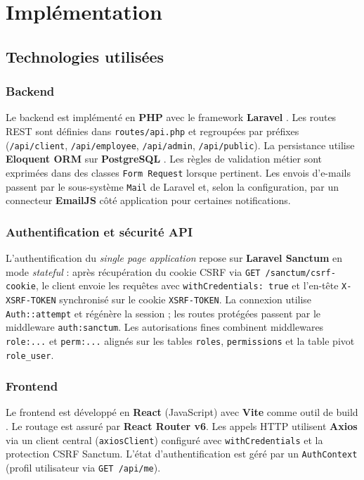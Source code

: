 \chapter{Implémentation}
\label{chap:impl}

\section{Technologies utilisées}

\subsection{Backend}

Le backend est implémenté en \textbf{PHP} avec le framework \textbf{Laravel} \cite{laraveldoc}. Les routes REST sont définies dans \texttt{routes/api.php} et regroupées par préfixes (\texttt{/api/client}, \texttt{/api/employee}, \texttt{/api/admin}, \texttt{/api/public}). La persistance utilise \textbf{Eloquent ORM} sur \textbf{PostgreSQL} \cite{postgresdoc}. Les règles de validation métier sont exprimées dans des classes \texttt{Form Request} lorsque pertinent. Les envois d'e-mails passent par le sous-système \texttt{Mail} de Laravel et, selon la configuration, par un connecteur \textbf{EmailJS} côté application pour certaines notifications.

\subsection{Authentification et sécurité API}

L'authentification du \emph{single page application} repose sur \textbf{Laravel Sanctum} en mode \emph{stateful} \cite{sanctumdoc} : après récupération du cookie CSRF via \texttt{GET /sanctum/csrf-cookie}, le client envoie les requêtes avec \texttt{withCredentials: true} et l'en-tête \texttt{X-XSRF-TOKEN} synchronisé sur le cookie \texttt{XSRF-TOKEN}. La connexion utilise \texttt{Auth::attempt} et régénère la session ; les routes protégées passent par le middleware \texttt{auth:sanctum}. Les autorisations fines combinent middlewares \texttt{role:...} et \texttt{perm:...} alignés sur les tables \texttt{roles}, \texttt{permissions} et la table pivot \texttt{role\_user}.

\subsection{Frontend}

Le frontend est développé en \textbf{React} (JavaScript) avec \textbf{Vite} comme outil de build \cite{reactdoc,vitedoc}. Le routage est assuré par \textbf{React Router v6}. Les appels HTTP utilisent \textbf{Axios} via un client central (\texttt{axiosClient}) configuré avec \texttt{withCredentials} et la protection CSRF Sanctum. L'état d'authentification est géré par un \texttt{AuthContext} (profil utilisateur via \texttt{GET /api/me}).

